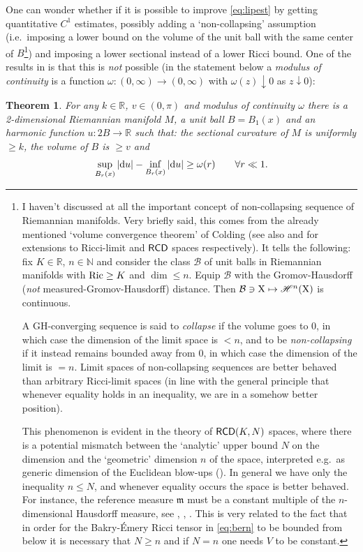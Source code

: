 \documentclass[11pt]{article}
\numberwithin{equation}{section}
\newtheorem{theorem}{Theorem}[section]
\newcommand{\N}{\mathbb{N}}
\newcommand{\R}{\mathbb{R}}
\newcommand{\X}{{\rm X}}
\newcommand{\mm}{{\mathfrak m}}
\newcommand{\RCD}{{\sf RCD}}
\renewcommand{\d}{{\rm d}}
\newcommand{\B}{\mathcal B}                            %
\newcommand{\Hi}{\mathscr H}
\newcommand{\Ric}{{\rm Ric}}
\begin{document}
One can wonder whether if it is possible to improve \eqref{eq:lipest} by getting quantitative $C^1$ estimates, possibly adding a `non-collapsing' assumption (i.e.\ imposing a lower bound on the volume of the unit ball with the same center of $B$\footnote{I haven't discussed at all the important concept of  non-collapsing sequence of Riemannian manifolds. Very briefly said, this comes from the already mentioned `volume convergence theorem' of Colding \cite{Colding97} (see also \cite{Cheeger-Colding97I}  and \cite{GDP17} for extensions to Ricci-limit and $\RCD$ spaces respectively). It tells the following: fix $K\in\R$, $n\in\N$ and consider the class $\B$ of unit balls in Riemannian manifolds with $\Ric\geq K$ and $\dim\leq n$. Equip $\B$ with the Gromov-Hausdorff (\emph{not} measured-Gromov-Hausdorff) distance. Then $\B\ni \X\mapsto \Hi^n(\X)$ is continuous. 

A GH-converging sequence is said to \emph{collapse} if the volume goes to 0, in which case the dimension of the limit space is $<n$, and to be \emph{non-collapsing} if it instead remains bounded away from 0, in which case the dimension of the limit is $=n$. Limit spaces of non-collapsing sequences are better behaved than arbitrary Ricci-limit spaces (in line with the general principle that whenever  equality holds in an inequality, we are in a somehow better position).

This phenomenon is evident in the theory of $\RCD(K,N)$ spaces, where there is a potential mismatch between the `analytic' upper bound $N$ on the dimension and the `geometric' dimension $n$ of the space, interpreted e.g.\ as generic dimension of the Euclidean blow-ups (\cite{BS18}). In general we have only the inequality $n\leq N$, and whenever equality occurs the space is better behaved. For instance, the reference measure $\mm$ must be a constant multiple of the $n$-dimensional Hausdorff measure, see \cite{H19}, \cite{HZ00}, \cite{BGHZ23}. This is very related to the fact that in order for the Bakry-\'Emery Ricci tensor in \eqref{eq:bern} to be bounded from below it is necessary that $N\geq n$ and if $N=n$ one needs $V$ to be constant.%
}) and imposing a lower sectional instead of a lower Ricci bound. One of the  results in \cite{DPZ19} is that this is \emph{not} possible (in the statement below a \emph{modulus of continuity} is a function $\omega:(0,\infty)\to( 0,\infty)$ with $\omega(z)\downarrow0$ as $z\downarrow0$):
\begin{theorem}\label{thm:DPZ}
For any $k\in\R$,  $v\in(0,\pi)$ and modulus of continuity $\omega$ there is a 2-dimensional Riemannian manifold $M$, a unit ball $B=B_1(x)$ and an harmonic function $u:2B\to\R$ such that: the sectional curvature of $M$ is uniformly $\geq k$, the volume of $B$ is $\geq v$ and 
\begin{equation}
\label{eq:failurec1}
\sup_{B_r(x)}|\d u|-\inf_{B_r(x)}|\d u|\geq \omega(r)\qquad\forall r\ll1.
\end{equation}
\end{theorem}
\end{document}
